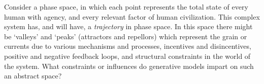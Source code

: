 \documentclass[11pt, oneside]{article}   	%
\begin{document}

























Consider a phase space, in which each point represents the total state of every human with agency, and every relevant factor of human civilization.  This complex system has, and will have, a \emph{trajectory} in phase space.  In this space there might be `valleys' and `peaks' (attractors and repellors) which represent the grain or currents due to various mechanisms and processes, incentives and disincentives, positive and negative feedback loops, and structural constraints in the world of the system.  What constraints or influences do generative models impart on such an abstract space?
\end{document}

